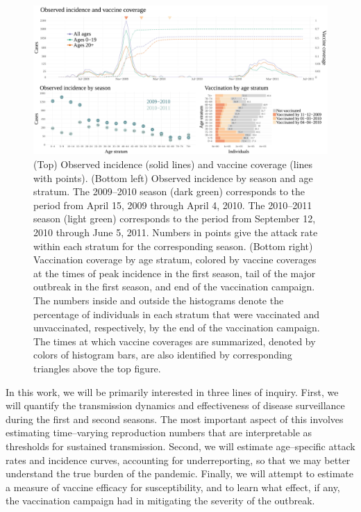 \begin{figure}
	\centering
	\includegraphics[width=\linewidth]{figures/fludat_plots}
	\caption{(Top) Observed incidence (solid lines) and vaccine coverage (lines with points). (Bottom left) Observed incidence by season and age stratum. The 2009--2010 season (dark green) corresponds to the period from April 15, 2009 through April 4, 2010. The 2010--2011 season (light green) corresponds to the period from September 12, 2010 through June 5, 2011. Numbers in points give the attack rate within each stratum for the corresponding season. (Bottom right) Vaccination coverage by age stratum, colored by vaccine coverages at the times of peak incidence in the first season, tail of the major outbreak in the first season, and end of the vaccination campaign. The numbers inside and outside the histograms denote the percentage of individuals in each stratum that were vaccinated and unvaccinated, respectively, by the end of the vaccination campaign. The times at which vaccine coverages are summarized, denoted by colors of histogram bars, are also identified by corresponding triangles above the top figure.}
	\label{fig:finland_fludat}
\end{figure}

In this work, we will be primarily interested in three lines of inquiry. First, we will quantify the transmission dynamics and effectiveness of disease surveillance during the first and second seasons. The most important aspect of this involves estimating time--varying reproduction numbers that are interpretable as thresholds for sustained transmission. Second, we will estimate age--specific attack rates and incidence curves, accounting for underreporting, so that we may better understand the true burden of the pandemic. Finally, we will attempt to estimate a measure of vaccine efficacy for susceptibility, and to learn what effect, if any, the vaccination campaign had in mitigating the severity of the outbreak.

